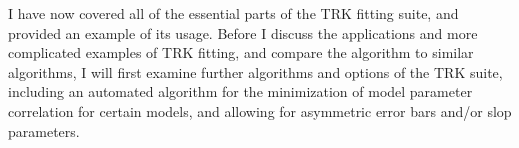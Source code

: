 I have now covered all of the essential parts of the TRK fitting suite, and provided an example of its usage. Before I  discuss the applications and more complicated examples of TRK fitting, and compare the algorithm to similar algorithms, I will first examine further algorithms and options of the TRK suite, including an automated algorithm for the minimization of model parameter correlation for certain models, and allowing for asymmetric error bars and/or slop parameters.